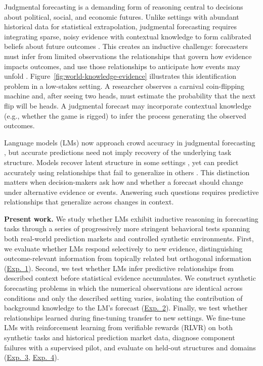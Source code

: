 \documentclass{article}
\begin{document}
Judgmental forecasting is a demanding form of reasoning central to decisions
about political, social, and economic futures. Unlike settings with abundant
historical data for statistical extrapolation, judgmental forecasting requires
integrating sparse, noisy evidence with contextual knowledge to form calibrated
beliefs about future outcomes
\citep{tetlock2016superforecasting,mellers2014psychological,lawrence2006judgmental}.
This creates an inductive challenge: forecasters must
infer from limited observations the relationships that govern how evidence
impacts outcomes, and use those relationships to anticipate how events may
unfold
\citep{tenenbaum2006theory,griffiths2010probabilistic,tenenbaum2011mind,lake2017building}.
Figure~\ref{fig:world-knowledge-evidence} illustrates this identification problem
in a low-stakes setting. A researcher observes a carnival coin-flipping machine
and, after seeing two heads, must estimate the probability that the next flip
will be heads. A judgmental forecast may incorporate contextual knowledge (e.g.,
whether the game is rigged) to infer the process generating the observed
outcomes.

Language models (LMs) now approach crowd accuracy in judgmental forecasting
\citep{halawi2024approaching,schoenegger2024wisdom}, but accurate predictions need
not imply recovery of the underlying task structure. Models recover latent
structure in some settings \citep{li2023emergent}, yet can predict accurately
using relationships that fail to generalize in others \citep{vafa2025foundation}.
This distinction matters when decision-makers ask how and whether a forecast
should change under alternative evidence or events. Answering such questions
requires predictive relationships that generalize across changes in context.

\noindent
\textbf{Present work.}
We study whether LMs exhibit inductive reasoning in forecasting tasks through a
series of progressively more stringent behavioral tests spanning both real-world
prediction markets and controlled synthetic environments. First, we evaluate
whether LMs respond selectively to new evidence, distinguishing
outcome-relevant information from topically related but orthogonal information
(\hyperref[sec:exp1]{Exp.~1}). Second, we test whether LMs infer predictive
relationships from described context before statistical evidence accumulates. We
construct synthetic forecasting problems in which the numerical observations are
identical across conditions and only the described setting varies, isolating the
contribution of background knowledge to the LM's forecast
(\hyperref[sec:exp2]{Exp.~2}). Finally, we test whether relationships learned
during fine-tuning transfer to new settings. We fine-tune LMs with reinforcement
learning from verifiable rewards (RLVR) on both synthetic tasks and historical
prediction market data, diagnose component failures with a supervised pilot,
and evaluate on held-out structures and domains
(\hyperref[sec:exp3]{Exp.~3}, \hyperref[sec:exp4]{Exp.~4}).
\end{document}
